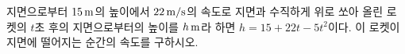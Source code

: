 지면으로부터 $15\mkern3mu \mathrm{m}$의 높이에서 $22\mkern3mu \mathrm{m/s}$의 속도로 지면과 수직하게 위로 쏘아 올린 로켓의 $t$초 후의 지면으로부터의 높이를 $h\mkern3mu \mathrm{m}$라 하면 $h=15+22t-5t^2$이다. 이 로켓이 지면에 떨어지는 순간의 속도를 구하시오.
